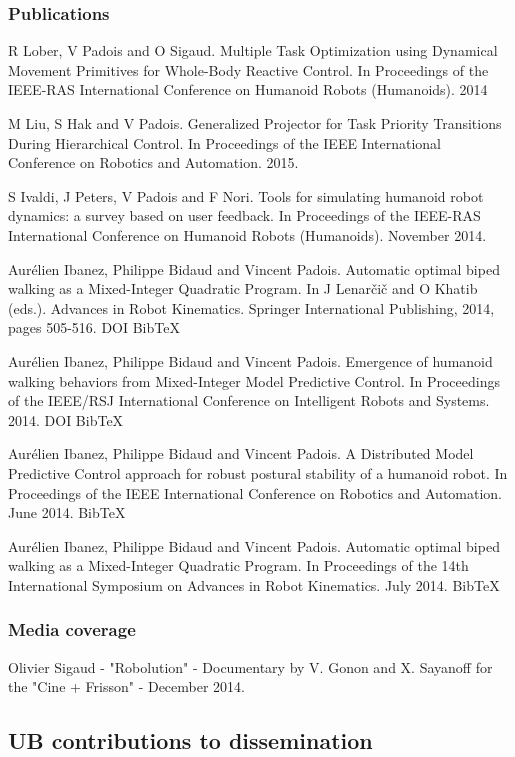 \subsubsection{Publications}
R Lober, V Padois and O Sigaud. Multiple Task Optimization using Dynamical Movement Primitives for Whole-Body Reactive Control. In Proceedings of the IEEE-RAS International Conference on Humanoid Robots (Humanoids). 2014

M Liu, S Hak and V Padois. Generalized Projector for Task Priority Transitions During Hierarchical Control. In Proceedings of the IEEE International Conference on Robotics and Automation. 2015.

S Ivaldi, J Peters, V Padois and F Nori. Tools for simulating humanoid robot dynamics: a survey based on user feedback. In Proceedings of the IEEE-RAS International Conference on Humanoid Robots (Humanoids). November 2014.

Aurélien Ibanez, Philippe Bidaud and Vincent Padois. Automatic optimal biped walking as a Mixed-Integer Quadratic Program. In J Lenar\v ci\v c and O Khatib (eds.). Advances in Robot Kinematics. Springer International Publishing, 2014, pages 505-516. DOI BibTeX

Aurélien Ibanez, Philippe Bidaud and Vincent Padois. Emergence of humanoid walking behaviors from Mixed-Integer Model Predictive Control. In Proceedings of the IEEE/RSJ International Conference on Intelligent Robots and Systems. 2014. DOI BibTeX

Aurélien Ibanez, Philippe Bidaud and Vincent Padois. A Distributed Model Predictive Control approach for robust postural stability of a humanoid robot. In Proceedings of the IEEE International Conference on Robotics and Automation. June 2014. BibTeX

Aurélien Ibanez, Philippe Bidaud and Vincent Padois. Automatic optimal biped walking as a Mixed-Integer Quadratic Program. In Proceedings of the 14th International Symposium on Advances in Robot Kinematics. July 2014. BibTeX

\subsubsection{Media coverage}

Olivier Sigaud - "Robolution" - Documentary by  V. Gonon and X. Sayanoff for the "Cine + Frisson" - December 2014.

\subsection{UB contributions to dissemination}

